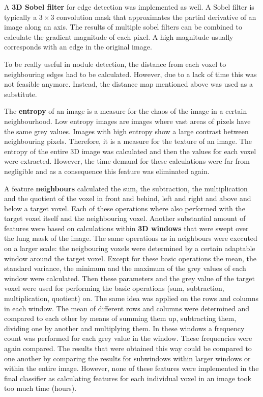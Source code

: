 A \textbf{3D Sobel filter} for edge detection was implemented as well. A Sobel
filter is typically a $3 \times 3$ convolution mask that approximates the
partial derivative of an image along an axis. The results of multiple sobel
filters can be combined to calculate the gradient magnitude of each pixel. A
high magnitude usually corresponds with an edge in the original image.

To be really useful in nodule detection, the distance from each voxel to
neighbouring edges had to be calculated. However, due to a lack of time this was
not feasible anymore. Instead, the distance map mentioned above was used as a
substitute.

The \textbf{entropy} of an image is a measure for the chaos of the image in a
certain neighbourhood. Low entropy images are images where vast areas of pixels
have the same grey values. Images with high entropy show a large contrast
between neighbouring pixels. Therefore, it is a measure for the texture of an
image. The entropy of the entire 3D image was calculated and then the values for
each voxel were extracted. However, the time demand for these calculations were
far from negligible and as a consequence this feature was eliminated again.

A feature \textbf{neighbours} calculated the sum, the subtraction, the
multiplication and the quotient of the voxel in front and behind, left and right
and above and below a target voxel. Each of these operations where also
performed with the target voxel itself and the neighbouring voxel. Another
substantial amount of features were based on calculations within \textbf{3D
windows} that were swept over the lung mask of the image. The same operations
as in neighbours were executed on a larger scale: the neigbouring voxels were
determined by a certain adaptable window around the target voxel. Except for
these basic operations the mean, the standard variance, the minimum and the
maximum of the grey values of each window were calculated. Then these parameters
and the grey value of the target voxel were used for performing the basic
operations (sum, subtraction, multiplication, quotient) on. The same idea was
applied on the rows and columns in each window. The mean of different rows and
columns were determined and compared to each other by means of summing them up,
subtracting them, dividing one by another and multiplying them. In these windows
a frequency count was performed for each grey value in the window. These
frequencies were again compared. The results that were obtained this way could
be compared to one another by comparing the results for subwindows within larger
windows or within the entire image. However, none of these features were
implemented in the final classifier as calculating features for each individual
voxel in an image took too much time (hours).

